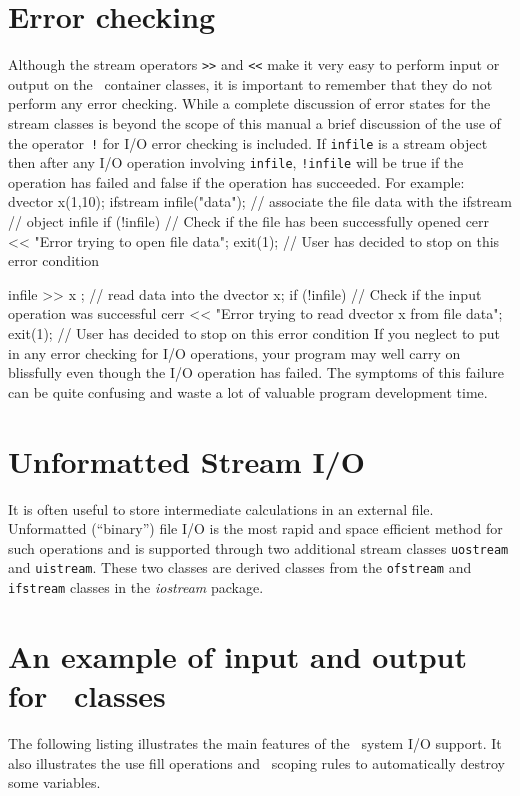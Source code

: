 \documentclass[12pt]{book}
\begin{document}
\section{Error checking}
Although the stream operators {\tt >>} and {\tt <<} make it very easy to
perform input or output on the \AD\ container classes, it is important to
remember that they do not perform any error checking. While a complete 
discussion of error states for the stream classes is beyond
the scope of this manual a brief discussion of the use of the 
operator~{\tt !} for I/O error checking is included. If
{\tt infile} is a stream object then after any I/O operation
involving {\tt infile}, {\tt !infile} will be true if the operation
has failed and false if the operation has succeeded. 
For example:
\beginexample
dvector x(1,10);
ifstream infile("data"); // associate the file data with the ifstream 
                         // object infile
if (!infile) // Check if the file has been successfully opened
{
  cerr << "Error trying to open file data\n";  
  exit(1); // User has decided to stop on this error condition
}
                            
infile >> x ;            // read data into the dvector x;
if (!infile) // Check if the input operation was successful
{
  cerr << "Error trying to read dvector x from file data\n";  
  exit(1); // User has decided to stop on this error condition
}
\endexample
If you neglect to put in any error checking for I/O operations, your
program may well carry on blissfully even though the I/O operation has
failed. The symptoms of this failure can be quite confusing
and waste a lot of valuable program development time.

\section{Unformatted Stream I/O}
It is often useful to store intermediate calculations in an external
file. Unformatted (``binary'') file I/O is the most rapid and space 
efficient method for such operations and
is supported
through two additional stream classes {\tt uostream} and {\tt uistream}.
These two classes are derived classes from the
{\tt ofstream} and {\tt ifstream} classes in the {\it iostream} package. 

\section{An example of input and output for \AD\ classes}
The following listing illustrates the main features of the \AD\ system
I/O support. It also illustrates the use fill operations
and \cplus\ scoping rules to
automatically destroy some variables.
\bigskip
{}
\end{document}
